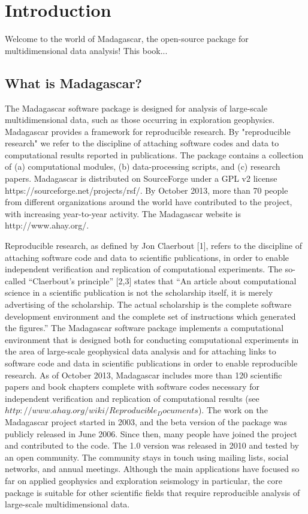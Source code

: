 \chapter{Introduction}

Welcome to the world of Madagascar, the open-source package for
multidimensional data analysis! This book...

\section{What is Madagascar?}

The Madagascar software package is designed for analysis of
large-scale multidimensional data, such as those occurring in
exploration geophysics. Madagascar provides a framework for
reproducible research. By "reproducible research" we
refer to the discipline of attaching software codes and data to
computational results reported in publications. The package contains a
collection of (a) computational modules, (b) data-processing scripts,
and (c) research papers. Madagascar is distributed on SourceForge
under a GPL v2 license https://sourceforge.net/projects/rsf/. By
October 2013, more than 70 people from different organizations around
the world have contributed to the project, with increasing
year-to-year activity. The Madagascar website is http://www.ahay.org/.

Reproducible research, as defined by Jon Claerbout [1], refers to the
discipline of attaching software code and data to scientific
publications, in order to enable independent verification and
replication of computational experiments. The so-called
``Claerbout's principle'' [2,3] states that
``An article about computational science in a scientific
publication is not the scholarship itself, it is merely advertising of
the scholarship. The actual scholarship is the complete software
development environment and the complete set of instructions which
generated the figures.'' The Madagascar software package
implements a computational environment that is designed both for
conducting computational experiments in the area of large-scale
geophysical data analysis and for attaching links to software code and
data in scientific publications in order to enable reproducible
research. As of October 2013, Madagascar includes more than 120
scientific papers and book chapters complete with software codes
necessary for independent verification and replication of
computational results (see
$http://www.ahay.org/wiki/Reproducible_Documents$).  The work on the
Madagascar project started in 2003, and the beta version of the
package was publicly released in June 2006. Since then, many people
have joined the project and contributed to the code. The 1.0 version
was released in 2010 and tested by an open community. The community
stays in touch using mailing lists, social networks, and annual
meetings.  Although the main applications have focused so far on
applied geophysics and exploration seismology in particular, the core
package is suitable for other scientific fields that require
reproducible analysis of large-scale multidimensional data.

